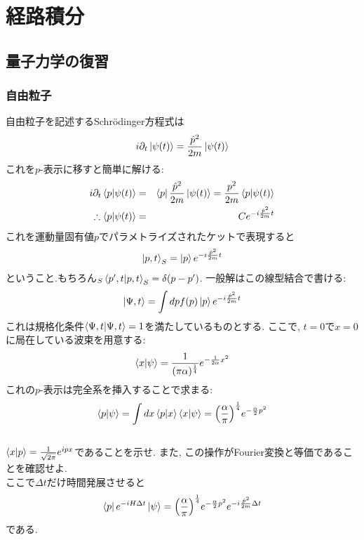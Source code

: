 \documentclass[10.5pt,a4paper]{jreport}
\begin{document}
\chapter{経路積分}
\section{量子力学の復習}
\subsection{自由粒子}
自由粒子を記述するSchr\"odinger方程式は
\begin{eqnarray}
  i\partial_t\ket{\psi(t)} = \frac{\hat{p}^2}{2m}\ket{\psi(t)}
\end{eqnarray}
これを$p$-表示に移すと簡単に解ける:
\begin{eqnarray}
  i\partial_t\bra{p}\ket{\psi(t)} &=& \bra{p}\frac{\hat{p}^2}{2m}\ket{\psi(t)} = \frac{p^2}{2m}\bra{p}\ket{\psi(t)}\\
  \therefore \bra{p}\ket{\psi(t)} &=& Ce^{-i\frac{\hat{p}^2}{2m}t}
\end{eqnarray}
これを運動量固有値$p$でパラメトライズされたケットで表現すると
\begin{eqnarray}
  \ket{p, t}_S = \ket{p}e^{-i\frac{\hat{p}^2}{2m}t}
\end{eqnarray}
ということ.もちろん$_S\bra{p', t}\ket{p, t}_S = \delta(p-p')$. 一般解はこの線型結合で書ける:
\begin{eqnarray}
  \ket{\Psi, t} = \int dp f(p)\ket{p}e^{-i\frac{\hat{p}^2}{2m}t}
\end{eqnarray}
これは規格化条件$\bra{\Psi, t}\ket{\Psi, t} = 1$を満たしているものとする. ここで, $t = 0$で$x = 0$に局在している波束を用意する:
\begin{eqnarray}
  \bra{x}\ket{\psi} = \frac{1}{(\pi\alpha)^{\frac{1}{4}}}e^{-\frac{1}{2\alpha}x^2}\label{FreeWavePacket}
\end{eqnarray}
これの$p$-表示は完全系を挿入することで求まる:
\begin{eqnarray}
  \bra{p}\ket{\psi} = \int dx\bra{p}\ket{x}\bra{x}\ket{\psi} = \qty(\frac{\alpha}{\pi})^{\frac{1}{4}}e^{-\frac{\alpha}{2}p^2}
\end{eqnarray}
\\

 $\bra{x}\ket{p} = \frac{1}{\sqrt{2\pi}}e^{ipx}$であることを示せ. また, この操作がFourier変換と等価であることを確認せよ.\\

ここで$\Delta t$だけ時間発展させると
\begin{eqnarray}
  \bra{p}e^{-iH\Delta t}\ket{\psi} = \qty(\frac{\alpha}{\pi})^{\frac{1}{4}}e^{-\frac{\alpha}{2}p^2}e^{-i\frac{\hat{p}^2}{2m}\Delta t}
\end{eqnarray}
である. \\
\end{document}
